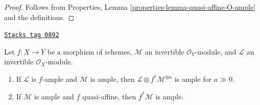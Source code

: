 \begin{proof}
Follows from Properties, Lemma \ref{properties-lemma-quasi-affine-O-ample}
and the definitions.
\end{proof}

\begin{lemma}
\label{morphisms-lemma-pullback-ample-tensor-relatively-ample}
\href{https://stacks.math.columbia.edu/tag/0892}{\texttt{Stacks tag 0892}}

Let $f : X \to Y$ be a morphism of schemes, $\mathcal{M}$
an invertible $\mathcal{O}_Y$-module, and $\mathcal{L}$ an
invertible $\mathcal{O}_X$-module.
\begin{enumerate}
\item If $\mathcal{L}$ is $f$-ample and $\mathcal{M}$
is ample, then $\mathcal{L} \otimes f^*\mathcal{M}^{\otimes a}$ is ample
for $a \gg 0$.
\item If $\mathcal{M}$ is ample
and $f$ quasi-affine, then $f^*\mathcal{M}$ is ample.
\end{enumerate}
\end{lemma}

